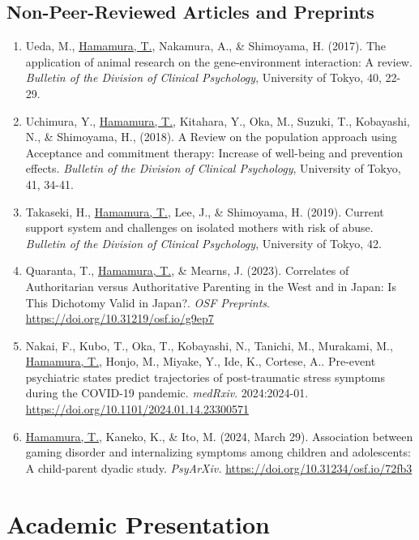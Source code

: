 \documentclass[a4paper]{article}
\begin{document}
\subsection{Non-Peer-Reviewed Articles and Preprints}
\begin{enumerate}
	\item Ueda, M., \underline{Hamamura, T.}, Nakamura, A., \& Shimoyama, H. (2017). The application of animal research on the gene-environment interaction: A review. \textit{Bulletin of the Division of Clinical Psychology}, University of Tokyo, 40, 22-29.
	\item Uchimura, Y., \underline{Hamamura, T.}, Kitahara, Y., Oka, M., Suzuki, T., Kobayashi, N., \& Shimoyama, H., (2018). A Review on the population approach using Acceptance and commitment therapy: Increase of well-being and prevention effects. \textit{Bulletin of the Division of Clinical Psychology}, University of Tokyo, 41, 34-41.
	\item Takaseki, H., \underline{Hamamura, T.}, Lee, J., \& Shimoyama, H. (2019). Current support system and challenges on isolated mothers with risk of abuse. \textit{Bulletin of the Division of Clinical Psychology}, University of Tokyo, 42.
	\item Quaranta, T., \underline{Hamamura, T.}, \& Mearns, J. (2023). Correlates of Authoritarian versus Authoritative Parenting in the West and in Japan: Is This Dichotomy Valid in Japan?. \textit{OSF Preprints}. \url{https://doi.org/10.31219/osf.io/g9ep7}
	\item Nakai, F., Kubo, T., Oka, T., Kobayashi, N., Tanichi, M., Murakami, M., \underline{Hamamura, T.}, Honjo, M., Miyake, Y., Ide, K., Cortese, A.. Pre-event psychiatric states predict trajectories of post-traumatic stress symptoms during the COVID-19 pandemic. \textit{medRxiv}. 2024:2024-01. \url{https://doi.org/10.1101/2024.01.14.23300571}
	\item \underline{Hamamura, T.}, Kaneko, K., \& Ito, M. (2024, March 29). Association between gaming disorder and internalizing symptoms among children and adolescents: A child-parent dyadic study. \textit{PsyArXiv.} \url{https://doi.org/10.31234/osf.io/72fb3}
	
\end{enumerate}
	 
\section{Academic Presentation}
\end{document}
